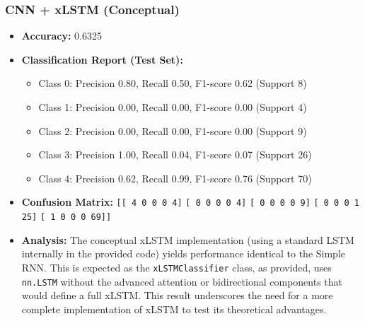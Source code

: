 \documentclass[a4paper]{article}
\begin{document}
\begin{multicols}{2}
\subsubsection{CNN + xLSTM (Conceptual)}
\begin{itemize}
    \item \textbf{Accuracy:} 0.6325 
    \item \textbf{Classification Report (Test Set):} 
        \begin{itemize}
            \item Class 0: Precision 0.80, Recall 0.50, F1-score 0.62 (Support 8)
            \item Class 1: Precision 0.00, Recall 0.00, F1-score 0.00 (Support 4)
            \item Class 2: Precision 0.00, Recall 0.00, F1-score 0.00 (Support 9)
            \item Class 3: Precision 1.00, Recall 0.04, F1-score 0.07 (Support 26)
            \item Class 4: Precision 0.62, Recall 0.99, F1-score 0.76 (Support 70)
        \end{itemize}
    \item \textbf{Confusion Matrix:} 
        \texttt{[[ 4 0 0 0 4]}
        \texttt{[ 0 0 0 0 4]}
        \texttt{[ 0 0 0 0 9]}
        \texttt{[ 0 0 0 1 25]}
        \texttt{[ 1 0 0 0 69]]}
    \item \textbf{Analysis:} The conceptual xLSTM implementation (using a standard LSTM internally in the provided code) yields performance identical to the Simple RNN. This is expected as the \texttt{xLSTMClassifier} class, as provided, uses \texttt{nn.LSTM} without the advanced attention or bidirectional components that would define a full xLSTM. This result underscores the need for a more complete implementation of xLSTM to test its theoretical advantages.

\end{itemize}


\end{multicols}
\end{document}
